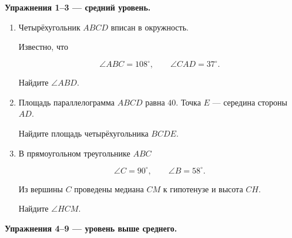 \documentclass[a4paper,12pt]{article}
\begin{document}
\textbf{Упражнения 1--3 --- средний уровень.}

\begin{enumerate}

\item
Четырёхугольник \(ABCD\) вписан в окружность.

Известно, что

\[
\angle ABC=108^\circ,
\qquad
\angle CAD=37^\circ.
\]

Найдите \(\angle ABD\).

\item
Площадь параллелограмма \(ABCD\) равна \(40\).
Точка \(E\) --- середина стороны \(AD\).

Найдите площадь четырёхугольника \(BCDE\).

\item
В прямоугольном треугольнике \(ABC\)

\[
\angle C=90^\circ,
\qquad
\angle B=58^\circ.
\]

Из вершины \(C\) проведены медиана \(CM\) к гипотенузе и высота \(CH\).

Найдите \(\angle HCM\).

\end{enumerate}

\vspace{3mm}

\textbf{Упражнения 4--9 --- уровень выше среднего.}
\end{document}
